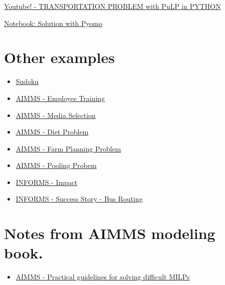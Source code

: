 \begin{enumerate}
\href{https://www.youtube.com/watch?v=Jr7LI-sUEmo}{Youtube! - TRANSPORTATION PROBLEM with PuLP in PYTHON}

\href{https://nbviewer.jupyter.org/github/Pyomo/PyomoGallery/blob/master/transport/transport.ipynb}{Notebook: Solution with Pyomo}



\section{Other examples}
\begin{itemize}
\item \href{https://www.juliaopt.org/notebooks/JuMP-Sudoku.html}{Sudoku}
\item \href{https://download.aimms.com/aimms/download/manuals/AIMMS3OM_EmployeeTraining.pdf}{AIMMS - Employee Training}

\item \href{https://download.aimms.com/aimms/download/manuals/AIMMS3OM_MediaSelection.pdf}{AIMMS - Media Selection}

\item \href{https://download.aimms.com/aimms/download/manuals/AIMMS3OM_Diet.pdf}{AIMMS - Diet Problem}

\item \href{https://download.aimms.com/aimms/download/manuals/AIMMS3OM_FarmPlanning.pdf}{AIMMS - Farm Planning Problem}

\item \href{https://download.aimms.com/aimms/download/manuals/AIMMS3OM_Pooling.pdf}{AIMMS - Pooling Probem}

\item \href{https://www.informs.org/Impact}{INFORMS - Impact}
\item \href{https://www.informs.org/Impact/O.R.-Analytics-Success-Stories/Optimized-school-bus-routing-helps-school-districts-design-better-policies}{INFORMS - Success Story - Bus Routing}
\end{itemize}

\section{Notes from AIMMS modeling book.}
\begin{itemize}

\item \href{http://inside.mines.edu/~anewman/MIP_practice120212.pdf}{AIMMS - Practical guidelines for solving difficult MILPs}


\end{itemize}
\end{enumerate}

